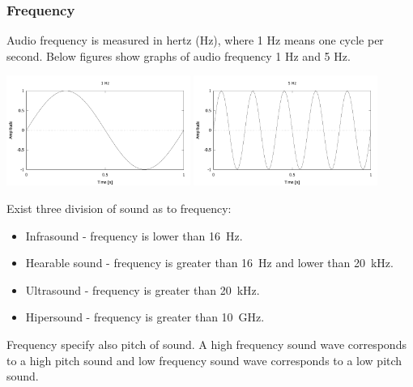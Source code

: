 \documentclass[11pt,titlepage]{article}
\theoremstyle{plain}
\begin{document}
\subsubsection{Frequency}
Audio frequency is measured in hertz (Hz), where 1 Hz means one cycle per second. Below figures show graphs of audio frequency 1 Hz and 5 Hz.

\begin{center}
	\includegraphics[width=0.45\textwidth]{img/frequency_1Hz}
	\includegraphics[width=0.45\textwidth]{img/frequency_5Hz}
\end{center}

Exist three division of sound as to frequency:
\begin{itemize}
	\item Infrasound - frequency is lower than 16~Hz.
	\item Hearable sound - frequency is greater than 16~Hz and lower than 20~kHz.
	\item Ultrasound - frequency is greater than 20~kHz.
	\item Hipersound - frequency is greater than 10~GHz.
\end{itemize}

Frequency specify also pitch of sound. A high frequency sound wave corresponds to a high pitch sound and low frequency sound wave corresponds to a low pitch sound.
\end{document}
